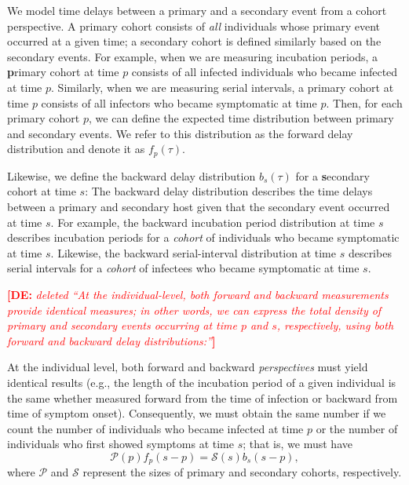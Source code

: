 \documentclass[12pt]{article}
\newcommand{\comment}{\showcomment}
\newcommand{\showcomment}[3]{\textcolor{#1}{\textbf{[#2: }\textsl{#3}\textbf{]}}}
\newcommand{\david}[1]{\comment{red}{DE}{#1}}
\newcommand{\pt}{p} %
\newcommand{\st}{s} %
\newcommand{\psize}{{\mathcal P}} %
\newcommand{\ssize}{{\mathcal S}} %
\begin{document}
We model time delays between a primary and a secondary event from a cohort perspective.
A primary cohort consists of \emph{all} individuals whose primary event occurred at a given time; 
a secondary cohort is defined similarly based on the secondary events.
For example, when we are measuring incubation periods, a \textbf{p}rimary cohort at time $\pt$ consists of all infected individuals who became infected at time $\pt$. 
Similarly, when we are measuring serial intervals, a primary cohort at time $\pt$ consists of all infectors who became symptomatic at time $\pt$.
Then, for each primary cohort $\pt$, we can define the expected time distribution between primary and secondary events.
We refer to this distribution as the forward delay distribution and denote it as $f_\pt(\tau)$.

Likewise, we define the backward delay distribution $b_\st(\tau)$ for a \textbf{s}econdary cohort at time $\st$:
The backward delay distribution describes the time delays between a primary and secondary host given that the secondary event occurred at time $\st$.
For example, the backward incubation period distribution at time $\st$ describes incubation periods for a \emph{cohort} of individuals who became symptomatic at time $\st$.
Likewise, the backward serial-interval distribution at time $\st$ describes serial intervals for a \emph{cohort} of infectees who became symptomatic at time $\st$.

\david{deleted ``At the individual-level, both forward and backward
  \emph{measurements} provide identical measures; in other words, we
  can express the total density of primary and secondary events
  occurring at time $\pt$ and $\st$, respectively, using both forward
  and backward delay \emph{distributions}:''}

At the individual level, both forward and backward \emph{perspectives}
must yield identical results (e.g., the length of the incubation
period of a given individual is the same whether measured forward from
the time of infection or backward from time of symptom onset).
Consequently, we must obtain the same number if we count the number of
individuals who became infected at time $\pt$ or the number of
individuals who first showed symptoms at time $\st$; that is, we must
have
\begin{equation}\label{eq:match}
\psize(\pt) f_\pt(\st-\pt) = \ssize(\st) b_\st(\st-\pt),
\end{equation}
where $\mathcal P$ and $\mathcal S$ represent the sizes of primary and
secondary cohorts, respectively.
\end{document}
